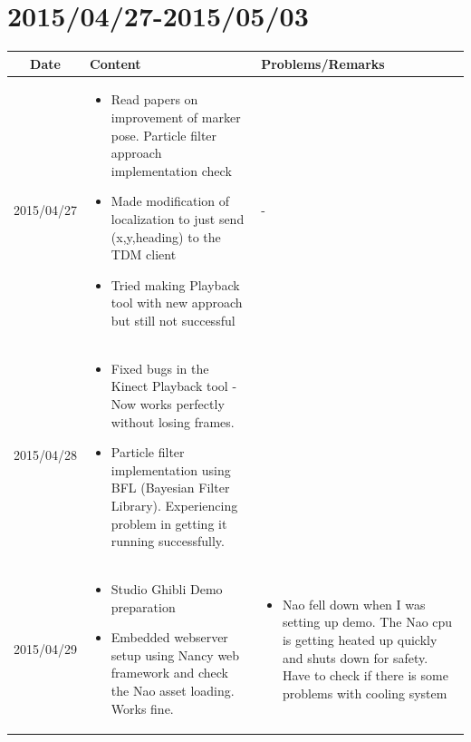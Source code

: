 \documentclass[11pt]{article} %
\begin{document}
\newpage
\section{2015/04/27-2015/05/03}

\begin{center}
    \begin{longtable}{ | c | p{6cm} | p{5cm} |}
    \hline
    Date & Content & Problems/Remarks \\ 
    \endhead
    \hline    
     2015/04/27         & 
  \begin{itemize}
  \item Read papers on improvement of marker pose. Particle filter approach implementation check
  \item Made modification of localization to just send (x,y,heading) to the TDM client
  \item Tried making Playback tool with new approach but still not successful
\end{itemize}  
   & - \\
\hline
  										 
 2015/04/28         & 
  \begin{itemize}
  \item Fixed bugs in the Kinect Playback tool - Now works perfectly without losing frames.
  \item Particle filter implementation using BFL (Bayesian Filter Library). Experiencing problem in getting it running successfully.
\end{itemize}   
& 
 \\
\hline
  										 
  
  2015/04/29        & 
  \begin{itemize}
  \item Studio Ghibli Demo preparation
  \item Embedded webserver setup using Nancy web framework and check the Nao asset loading. Works fine.
  \end{itemize}   
  										 & 
  \begin{itemize}
  \item Nao fell down when I was setting up demo. The Nao cpu is getting heated up quickly and shuts down for safety. Have to check if there is some problems with cooling system
  \end{itemize}
  										 \\
  \hline
  

\end{longtable}
\end{center}
\end{document}
